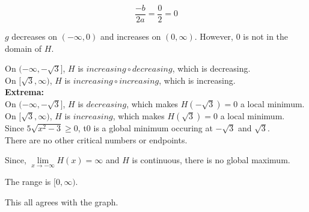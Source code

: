 \documentclass{ximera}
\begin{document}
\[
\frac{-b}{2 a} = \frac{0}{2} = 0
\]


$g$ decreases on $(-\infty, 0)$ and increases on $(0, \infty)$.  However, $0$ is not in the domain of $H$.





On $(-\infty, -\sqrt{3}]$, $H$ is $increasing \circ decreasing$, which is decreasing. \\


On $[\sqrt{3}, \infty)$, $H$ is $increasing \circ increasing$, which is increasing. \\






\textbf{\textcolor{blue!55!black}{Extrema:}} \\



On $(-\infty, -\sqrt{3}]$, $H$ is $decreasing$, which makes $H(-\sqrt{3}) = 0$ a local minimum.  \\


On $[\sqrt{3}, \infty)$, $H$ is $increasing$, which makes $H(\sqrt{3}) = 0$ a local minimum.  \\





Since $5 \sqrt{x^2-3} \geq 0$, t$0$ is a global minimum occuring at $-\sqrt{3}$ and $\sqrt{3}$. \\



There are no other critical numbers or endpoints.


Since, $\lim\limits_{x \to -\infty} H(x) = \infty$ and $H$ is continuous, there is no global maximum. 



The range is $[0, \infty)$.




This all agrees with the graph. \\
\end{document}
